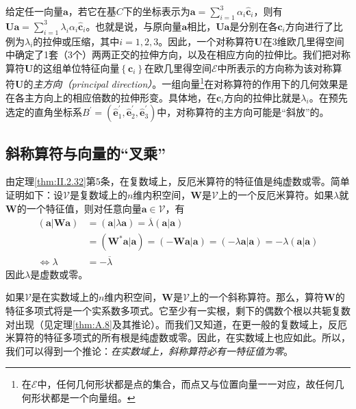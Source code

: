 \documentclass[../main.tex]{subfiles}
\begin{document}
给定任一向量$\mathbf{a}$，若它在基$C$下的坐标表示为$\mathbf{a}=\sum_{i=1}^3\alpha_i\mathbf{\hat{c}}_i$，则有$\mathbf{Ua}=\sum_{i=1}^3\lambda_i\alpha_i\mathbf{\hat{c}}_i$。也就是说，与原向量$\mathbf{a}$相比，$\mathbf{Ua}$是分别在各$\mathbf{\hat{c}}_i$方向进行了比例为$\lambda_i$的拉伸或压缩，其中$i=1,2,3$。因此，一个对称算符$\mathbf{U}$在3维欧几里得空间中确定了1套（3个）两两正交的拉伸方向，以及在相应方向的拉伸比。我们把对称算符$\mathbf{U}$的这组单位特征向量$\left\{\mathbf{c}_i\right\}$在欧几里得空间$\mathcal{E}$中所表示的方向称为该对称算符$\mathbf{U}$的\emph{主方向（principal direction）}。一组向量\footnote{在$\mathcal{E}$中，任何几何形状都是点的集合，而点又与位置向量一一对应，故任何几何形状都是一个向量组。}在对称算符的作用下的几何效果是在各主方向上的相应倍数的拉伸形变。具体地，在$\mathbf{c}_i$方向的拉伸比就是$\lambda_i$。在预先选定的直角坐标系$B^\prime=\left(\mathbf{\hat{e}}^\prime_1,\mathbf{\hat{e}}^\prime_2,\mathbf{\hat{e}}^\prime_3\right)$中，对称算符的主方向可能是“斜放”的。

\subsection{斜称算符与向量的“叉乘”}\label{sec:II.3.3.3}
由定理\ref{thm:II.2.32}第5条，在复数域上，反厄米算符的特征值是纯虚数或零。简单证明如下：设$\mathcal{V}$是复数域上的$n$维内积空间，$\mathbf{W}$是$\mathcal{V}$上的一个反厄米算符。如果$\lambda$就$\mathbf{W}$的一个特征值，则对任意向量$\mathbf{a}\in\mathcal{V}$，有
\[\begin{aligned}
        \left(\mathbf{a}|\mathbf{Wa}\right) & =\left(\mathbf{a}|\lambda\mathbf{a}\right)=\overline{\lambda}\left(\mathbf{a}|\mathbf{a}\right)                                                                            \\
                                            & =\left(\mathbf{W}^*\mathbf{a}|\mathbf{a}\right)=\left(-\mathbf{Wa}|\mathbf{a}\right)=\left(-\lambda\mathbf{a}|\mathbf{a}\right)=-\lambda\left(\mathbf{a}|\mathbf{a}\right) \\
        \Leftrightarrow\lambda              & =-\overline{\lambda}
    \end{aligned}\]
因此$\lambda$是虚数或零。

如果$\mathcal{V}$是在实数域上的$n$维内积空间，$\mathbf{W}$是$\mathcal{V}$上的一个斜称算符。那么，算符$\mathbf{W}$的特征多项式将是一个实系数多项式。它至少有一实根，剩下的偶数个根以共轭复数对出现（见定理\ref{thm:A.8}及其推论）。而我们又知道，在更一般的复数域上，反厄米算符的特征多项式的所有根是纯虚数或零。因此，在实数域上也应如此。所以，我们可以得到一个推论：\emph{在实数域上，斜称算符必有一特征值为零}。
\end{document}
